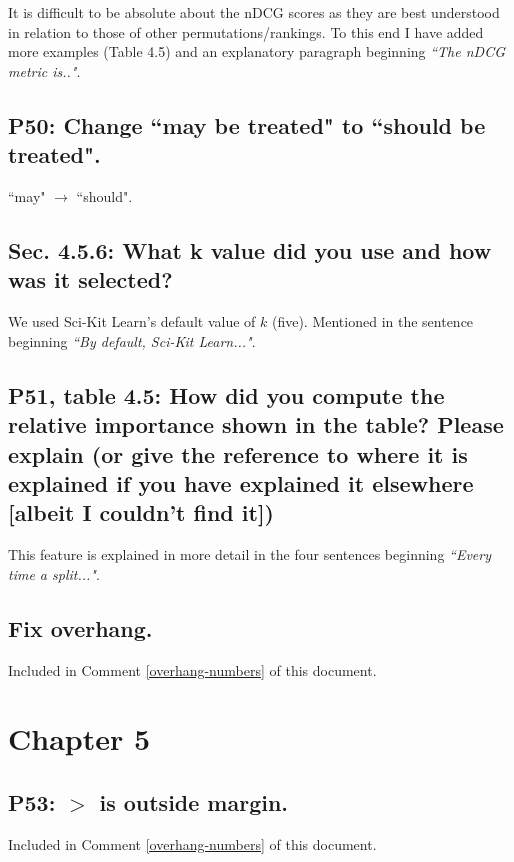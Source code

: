 \documentclass[]{article}
\begin{document}
It is difficult to be absolute about the nDCG scores as they are best understood in relation to those of other permutations/rankings.
To this end I have added more examples (Table 4.5) and an explanatory paragraph beginning \emph{``The nDCG metric is.."}.

\subsection{P50: Change ``may be treated" to ``should be treated".} 

``may" $\rightarrow$ ``should".
	
\subsection{Sec. 4.5.6: What k value did you use and how was it selected?}

We used Sci-Kit Learn's default value of $k$ (five). Mentioned in the sentence beginning \emph{``By default, Sci-Kit Learn..."}.

\subsection{P51, table 4.5: How did you compute the relative importance shown in the table? Please explain (or give the reference to where it is explained if you have explained it elsewhere [albeit I couldn't find it])}

This feature is explained in more detail in the four sentences beginning \emph{``Every time a split..."}.

\subsection{Fix overhang.}

Included in Comment \ref{overhang-numbers} of this document.

\section{Chapter 5}

\subsection{P53: $>$ is outside margin.}

Included in Comment \ref{overhang-numbers} of this document.
\end{document}
